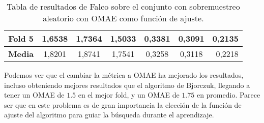 \begin{table}[H]
{\begin{tabular}{|crrrrrr|}
\multicolumn{1}{|c|}{\textbf{Fold 5}} & \multicolumn{1}{c|}{1,6538}            & \multicolumn{1}{c|}{1,7364}              & \multicolumn{1}{c|}{\textbf{1,5033}} & \multicolumn{1}{c|}{0,3381}            & \multicolumn{1}{c|}{0,3091}              & 0,2135                             \\ \hline
\multicolumn{1}{|c|}{\textbf{Media}}  & \multicolumn{1}{c|}{1,8201}           & \multicolumn{1}{c|}{1,8741}             & \multicolumn{1}{c|}{1,7541}         & \multicolumn{1}{c|}{0,3258}            & \multicolumn{1}{c|}{0,3118}             & 0,2218                            \\ \hline
\end{tabular}%
}
\caption{Tabla de resultados de Falco sobre el conjunto con sobremuestreo aleatorio con OMAE como función de ajuste.}\label{tablaFALCOconOMAE}
\end{table}

Podemos ver que el cambiar la métrica a OMAE ha mejorado los resultados, incluso obteniendo mejores resultados que el algoritmo de Bjorczuk, llegando a tener un OMAE de $1.5$ en el mejor fold, y un OMAE de $1.75$ en promedio. Parece ser que en este problema es de gran importancia la elección de la función de ajuste del algoritmo para guiar la búsqueda durante el aprendizaje.


